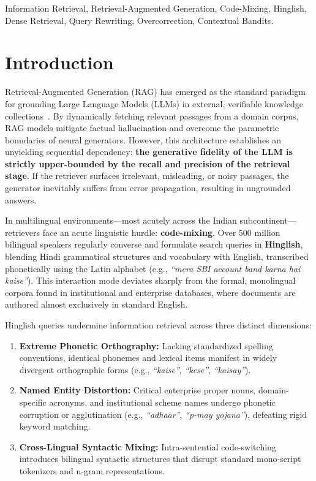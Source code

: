 \documentclass[conference]{IEEEtran}
\begin{document}
\begin{IEEEkeywords}
Information Retrieval, Retrieval-Augmented Generation, Code-Mixing, Hinglish, Dense Retrieval, Query Rewriting, Overcorrection, Contextual Bandits.
\end{IEEEkeywords}

\section{Introduction}
\label{sec:intro}

Retrieval-Augmented Generation (RAG) has emerged as the standard paradigm for grounding Large Language Models (LLMs) in external, verifiable knowledge collections~\cite{gao2023precise}. By dynamically fetching relevant passages from a domain corpus, RAG models mitigate factual hallucination and overcome the parametric boundaries of neural generators. However, this architecture establishes an unyielding sequential dependency: \textbf{the generative fidelity of the LLM is strictly upper-bounded by the recall and precision of the retrieval stage}. If the retriever surfaces irrelevant, misleading, or noisy passages, the generator inevitably suffers from error propagation, resulting in ungrounded answers.

In multilingual environments---most acutely across the Indian subcontinent---retrievers face an acute linguistic hurdle: \textbf{code-mixing}. Over 500 million bilingual speakers regularly converse and formulate search queries in \textbf{Hinglish}, blending Hindi grammatical structures and vocabulary with English, transcribed phonetically using the Latin alphabet (e.g., \textit{``mera SBI account band karna hai kaise''}). This interaction mode deviates sharply from the formal, monolingual corpora found in institutional and enterprise databases, where documents are authored almost exclusively in standard English. 

Hinglish queries undermine information retrieval across three distinct dimensions:
\begin{enumerate}
    \item \textbf{Extreme Phonetic Orthography:} Lacking standardized spelling conventions, identical phonemes and lexical items manifest in widely divergent orthographic forms (e.g., \textit{``kaise''}, \textit{``kese''}, \textit{``kaisay''}).
    \item \textbf{Named Entity Distortion:} Critical enterprise proper nouns, domain-specific acronyms, and institutional scheme names undergo phonetic corruption or agglutination (e.g., \textit{``adhaar''}, \textit{``p-may yojana''}), defeating rigid keyword matching.
    \item \textbf{Cross-Lingual Syntactic Mixing:} Intra-sentential code-switching introduces bilingual syntactic structures that disrupt standard mono-script tokenizers and n-gram representations.
\end{enumerate}
\end{document}
